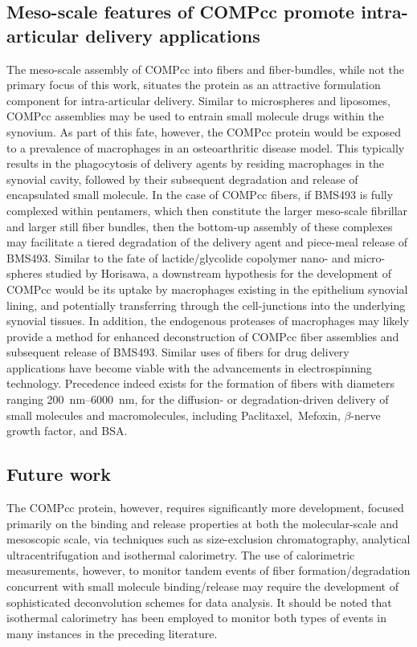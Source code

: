 \begin{refsection}
\subsection{Meso-scale features of COMPcc promote intra-articular delivery
applications}
\label{sec:invivo_fate}
The meso-scale assembly of COMPcc into fibers and fiber-bundles, while not the
primary focus of this work, situates the protein as an attractive formulation
component for intra-articular delivery.\cite{Gerwin2006} Similar to
microspheres and liposomes, COMPcc assemblies may be used to entrain small
molecule drugs within the synovium. As part of this fate, however, the COMPcc
protein would be exposed to a prevalence of macrophages in an osteoarthritic
disease model. This typically results in the phagocytosis of delivery agents by
residing macrophages in the synovial cavity,
followed by their subsequent degradation and release of encapsulated small
molecule. In the case of COMPcc fibers, if BMS493 is fully complexed within
pentamers, which then constitute the larger meso-scale fibrillar and larger
still fiber bundles, then the bottom-up assembly of these complexes may
facilitate a tiered degradation of the delivery agent and piece-meal release of
BMS493. Similar to the fate of \iupac{\D\L-}lactide/glycolide copolymer nano-
and micro-spheres studied by Horisawa,\cite{Horisawa2002} a downstream
hypothesis for the development of COMPcc would be its uptake by macrophages
existing in the epithelium synovial lining, and potentially transferring through
the cell-junctions into the underlying synovial tissues. In addition, the
endogenous proteases of macrophages may likely provide a method for enhanced
deconstruction of COMPcc fiber assemblies and subsequent release of BMS493.
Similar uses of fibers for drug delivery applications have become viable with
the advancements in electrospinning technology.\cite{Sill2008} Precedence indeed
exists for the formation of fibers with diameters ranging
\SIrange{200}{6000}{\nm}, for the diffusion- or degradation-driven delivery of
small molecules and macromolecules, including Paclitaxel,\ Mefoxin,
${\beta}$-nerve growth factor, and BSA.\cite{Liang2005,Chew2005,Xu2006a}

\subsection{Future work}
The COMPcc protein, however, requires significantly more development, focused
primarily on the binding and release properties at both the molecular-scale and
mesoscopic scale, via techniques such as size-exclusion chromatography,
analytical ultracentrifugation and isothermal calorimetry. The use of
calorimetric measurements, however, to monitor tandem events of fiber
formation/degradation concurrent with small molecule binding/release may require
the development of sophisticated deconvolution schemes for data analysis. It
should be noted that isothermal calorimetry has been employed to monitor both
types of events in many instances in the preceding literature.\cite{Kardos2004}


\end{refsection}
